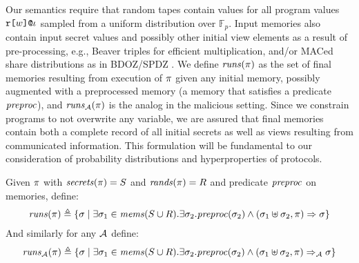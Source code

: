 Our semantics require that random tapes contain values for all program
values $\texttt{r[}w\texttt{]}\texttt{@}\iota$ sampled from a uniform distribution
over $\mathbb{F}_p$. Input memories also contain input secret values
and possibly other initial view elements as a result of
pre-processing, e.g., Beaver triples for efficient multiplication,
and/or MACed share distributions as in BDOZ/SPDZ
\cite{evans2018pragmatic,10.1007/978-3-030-68869-1_3}. We define
$\mathit{runs}(\pi)$ as the set of final memories resulting from execution
of $\pi$ given any initial memory, possibly augmented with a
preprocessed memory (a memory that satisfies a predicate $\mathit{preproc}$),
and $\mathit{runs}_{\mathcal{A}}(\pi)$ is the analog in the malicious setting. Since we
constrain programs to not overwrite any variable, we are assured that
final memories contain both a complete record of all initial secrets
as well as views resulting from communicated information. This
formulation will be fundamental to our consideration of probability
distributions and hyperproperties of protocols.
\begin{definition}
  \label{def-runs}
  Given $\pi$ with $\mathit{secrets}(\pi) = S$ and $\mathit{rands}(\pi) = R$ and
  predicate $\mathit{preproc}$ on memories, define:
  $$
  \begin{array}{c}
    \mathit{runs}(\pi) \triangleq 
    \{ \sigma \mid \exists \sigma_1 \in \mathit{mems}(S \cup R) . 
    \exists \sigma_2 . \mathit{preproc}(\sigma_2) \wedge
    (\sigma_1 \uplus \sigma_2,\pi) \Rightarrow \sigma \}
  \end{array}
  $$
  And similarly for any $\mathcal{A}$ define:
  $$
  \begin{array}{c}
    \mathit{runs}_{\mathcal{A}}(\pi) \triangleq 
    \{ \sigma \mid \exists \sigma_1 \in \mathit{mems}(S \cup R) . 
    \exists \sigma_2 . \mathit{preproc}(\sigma_2) \wedge
    (\sigma_1 \uplus \sigma_2,\pi) \Rightarrow_{\mathcal{A}} \sigma \}
  \end{array}
  $$
\end{definition}

